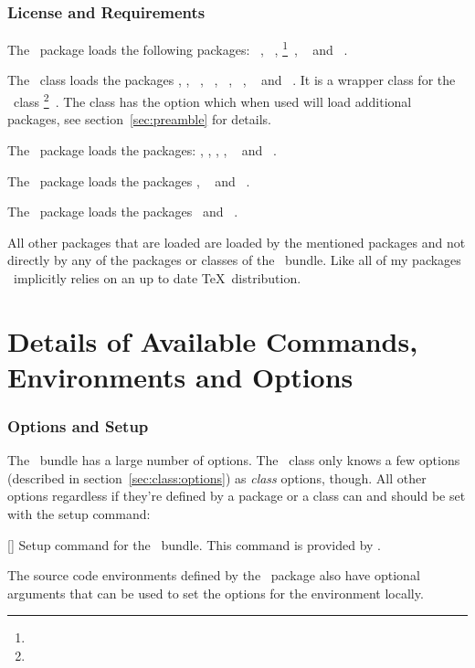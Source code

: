 \documentclass[load-preamble+,babel-options={ngerman,english}]{cnltx-doc}
\begin{document}
\section{License and Requirements}\label{sec:license}
\license

The \cnltxbase\ package loads the following packages:
~\cite{pkg:pgfopts},
~\cite{pkg:etoolbox},
\footnote{}~\cite{pkg:ltxcmds},
~\cite{pkg:trimspaces} and
~\cite{pkg:xcolor}.

The \cnltxdoc\ class loads the packages \cnltxbase, \cnltxexample,
~\cite{pkg:ulem},
~\cite{pkg:translations},
~\cite{pkg:multicol},
~\cite{pkg:ragged2e},
~\cite{pkg:marginnote} and
~\cite{pkg:hyperref}.  It is a wrapper class for the
\KOMAScript\ class
\footnote{}~\cite{bnd:koma-script}.  The
class has the option  which when used will load
additional packages, see section~\vref{sec:preamble} for details.

The \cnltxexample\ package loads the packages: \cnltxbase, \cnltxlistings,
\cnltxtools, ,
~\cite{pkg:mdframed} and
~\cite{pkg:idxcmds}.

The \cnltxlistings\ package loads the packages \cnltxbase,
~\cite{pkg:listings} and
~\cite{pkg:catchfile}.

The \cnltxtools\ package loads the packages \cnltxbase\ and
~\cite{pkg:accsupp}.

All other packages that are loaded are loaded by the mentioned packages and
not directly by any of the packages or classes of the \cnltx\ bundle.  Like
all of my packages \cnltx\ implicitly relies on an up to date \TeX\
distribution.

\part{Details of Available Commands, Environments and Options}

\section{Options and Setup}
The \cnltx\ bundle has a large number of options.  The \cnltxdoc\ class only
knows a few options (described in section~\vref{sec:class:options}) as
\emph{class} options, though.  All other options regardless if they're defined
by a package or a class can and should be set with the setup command:
\begin{commands}
  []
    Setup command for the \cnltx\ bundle.  This command is provided by
    \cnltxbase.
\end{commands}
The source code environments defined by the \cnltxexample\ package also have
optional arguments that can be used to set the options for the environment
locally.
\end{document}
